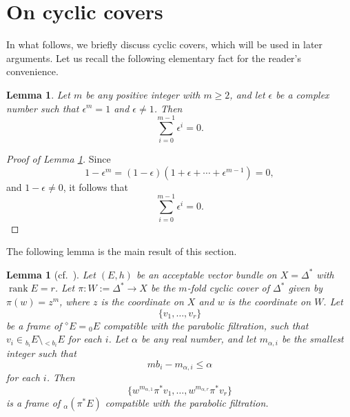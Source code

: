 \documentclass[12pt,twoside]{amsart}
\DeclareMathOperator{\rank}{rank}
\newtheorem{lem}[thm]{Lemma}
\theoremstyle{definition}
\begin{document}
\section{On cyclic covers}\label{p-sec11}

In what follows, we briefly discuss cyclic 
covers, which will be used in later arguments. 
Let us recall the following elementary fact for the reader's convenience. 

\begin{lem}\label{p-lem11.1} 
Let $m$ be any positive integer with $m \geq 2$, and let 
$\epsilon$ be a complex number such that $\epsilon^m = 1$ and $\epsilon \ne 1$. 
Then 
\[
\sum_{i=0}^{m-1} \epsilon^i = 0.
\]
\end{lem}

\begin{proof}[Proof of Lemma \ref{p-lem11.1}]
Since 
\[
1 - \epsilon^m = (1 - \epsilon)(1 + \epsilon + \cdots + \epsilon^{m-1}) = 0,
\]
and $1 - \epsilon \ne 0$, it follows that 
\[
\sum_{i=0}^{m-1} \epsilon^i = 0.
\]
\end{proof}

The following lemma is the main result of this section.

\begin{lem}[{cf.~\cite[Lemma 10.3]{simpson1}}]\label{p-lem11.2} 
Let $(E, h)$ be an acceptable vector bundle on $X = \Delta^*$ with $\rank E = r$. 
Let $\pi \colon W := \Delta^* \to X$ be 
the $m$-fold cyclic cover of $\Delta^*$ 
given by $\pi(w) = z^m$, where $z$ is the coordinate on $X$ and $w$ is the coordinate on $W$. 
Let 
\[
\{v_1, \ldots, v_r\}
\] 
be a frame of ${}^\diamond\! E = {}_0E$ 
compatible with the parabolic filtration, 
such that $v_i \in {}_{b_i}E \setminus {}_{< b_i}E$ for each $i$. 
Let $\alpha$ be any real number, and let $m_{\alpha,i}$ be the smallest integer such that 
\[
m b_i - m_{\alpha,i} \leq \alpha
\] 
for each $i$. 
Then 
\[
\{w^{m_{\alpha,1}} \pi^*v_1, \ldots, w^{m_{\alpha,r}} \pi^*v_r\}
\] 
is a frame of ${}_\alpha (\pi^*E)$ compatible with the parabolic filtration. 
\end{lem}
\end{document}
